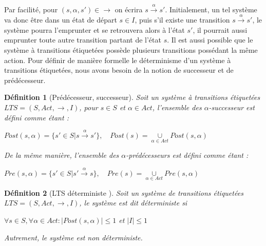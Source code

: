 \documentclass[a4paper]{report}
\theoremstyle{break}
\newtheorem{defin}{Définition}
\theoremstyle{breakplain}
\begin{document}
Par facilité, pour $(s, \alpha, s') \in \rightarrow$ on écrira $s\xrightarrow{\alpha}{}s'$. Initialement, un tel système va donc être dans un état de départ $s\in I$, puis s'il existe une transition $s\xrightarrow{\alpha}{}s'$, le système pourra l'emprunter et se retrouvera alors à l'état $s'$, il pourrait aussi emprunter toute autre transition partant de l'état $s$. Il est aussi possible que le système à transitions étiquetées possède plusieurs transitions possédant la même action. Pour définir de manière formelle le déterminisme d'un système à transitions étiquetées, nous avons besoin de la notion de successeur et de prédécesseur.


\begin{defin}[Prédécesseur, successeur\cite{baier2008principles}]
Soit un système à transitions étiquetées $LTS = (S, Act, \rightarrow, I)$, pour $s \in S$ et $\alpha \in Act$, l'ensemble des $\alpha$-successeur est défini comme étant :
\begin{center}
$Post(s,\alpha) = \{ s' \in S | s\xrightarrow{\alpha}{}s' \}, \quad Post(s) = \underset{\alpha \in Act}{\cup} Post(s, \alpha)$
\end{center}
De la même manière, l'ensemble des $\alpha$-prédécesseurs est défini comme étant :
\begin{center}
$Pre(s,\alpha) = \{ s' \in S | s'\xrightarrow{\alpha}{}s \}, \quad Pre(s) = \underset{\alpha \in Act}{\cup} Pre(s, \alpha)$
\end{center}
\end{defin}

\begin{defin}[LTS déterministe \cite{baier2008principles}]
Soit un système de transitions étiquetées $LTS = (S, Act, \rightarrow, I)$, le système est dit déterministe si 
\begin{center}
$\forall s \in S, \forall \alpha \in Act : |Post(s,\alpha)| \leq 1$ et $|I| \leq 1$
\end{center}
Autrement, le système est non déterministe.
\end{defin}

\end{document}
